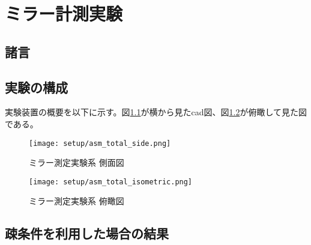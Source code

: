 \chapter{ミラー計測実験}
\thispagestyle{empty}
\label{chap5}
\graphicspath{{chap5/figure/}}
\minitoc

\newpage


\section{諸言}
\label{chap5_introduction}

\clearpage
\newpage

\section{実験の構成}

実験装置の概要を以下に示す。図\ref{fig:mirror_experiment_asm_cad_side}が横から見たcad図、図\ref{fig:mirror_experiment_asm_cad_isometric}が俯瞰して見た図である。

\begin{figure}[!ht]
\centering
\texttt{[image: setup/asm\_total\_side.png]}
\caption{ミラー測定実験系 側面図}
\label{fig:mirror_experiment_asm_cad_side}
\end{figure}

\begin{figure}[!ht]
\centering
\texttt{[image: setup/asm\_total\_isometric.png]}
\caption{ミラー測定実験系 俯瞰図}
\label{fig:mirror_experiment_asm_cad_isometric}
\end{figure}


\clearpage

\newpage

\section{疎条件を利用した場合の結果}

\clearpage
\newpage


